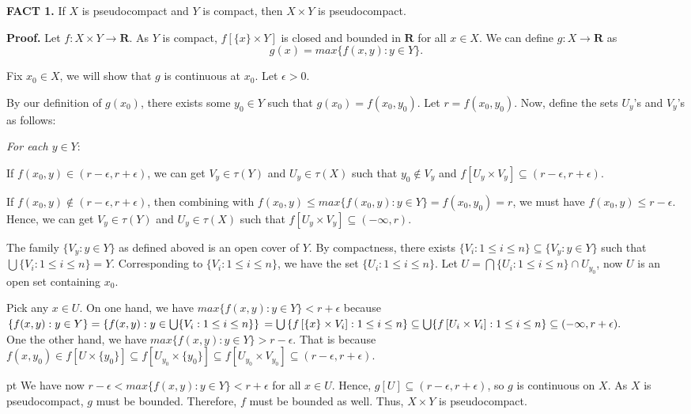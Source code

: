 \documentclass{article}
\begin{document}
\textbf{FACT 1.} If $X$ is pseudocompact and $Y$ is compact, then $X\times Y$ is pseudocompact. 

\vskip 15pt


\textbf{Proof.} Let $f: X\times Y \rightarrow \textbf{R}$. As $Y$ is compact, $f\left[ \{x\} \times Y\right] $ is 
closed and bounded in $\textbf{R}$ for all $x \in X$. We can define $g:X \rightarrow \textbf{R}$ as 
$$g(x)=max \{f(x,y):y\in Y\}.$$

Fix $x_0 \in X$, we will show that $g$ is continuous at $x_0$. Let $\epsilon >0$. 

\vskip 10pt


By our definition of $g(x_0)$, there exists some $y_0\in Y$ such that $g(x_0)=f(x_0,y_0)$. Let $r=f(x_0,y_0)$. Now, define the sets $U_y$'s and $V_y$'s as follows:  \vskip 12pt

\textsl{For each $y\in Y:$ }

If $f(x_0,y) \in (r-\epsilon, r+\epsilon)$, we can get $V_{y} \in \tau(Y) $ and $U_{y} \in \tau(X)$ such that $y_0\notin V_{y}$ and $f\left[U_y \times V_y\right] \subseteq (r-\epsilon, r+\epsilon)$. 

If $f(x_0,y) \notin (r-\epsilon, r+\epsilon)$, then combining with $f(x_0,y)\leq max\{f(x_0,y):y\in Y\}=f(x_0,y_0)=r$, we must have $f(x_0,y)\leq r-\epsilon$. Hence, we can get $V_{y} \in \tau(Y) $ and $U_{y} \in \tau(X)$ such that $f\left[U_y \times V_y\right] \subseteq (-\infty, r).$ \\

\vskip 12pt

The family $\{V_y: y\in Y\}$ as defined aboved is an open cover of $Y$. By compactness, there exists $\{V_i: 1\leq i \leq n\} \subseteq \{V_y: y\in Y\}$ such that $\bigcup \{V_i: 1\leq i \leq n\} = Y$. Corresponding to $\{V_i: 1\leq i \leq n\}$, we have the set $\{U_i: 1\leq i \leq n\}$. Let $U=\bigcap \{U_i: 1\leq i \leq n\} \cap U_{y_0}$, now $U$ is an open set containing $x_0$. \\

\vskip 5pt

Pick any $x\in U$. 
\vskip 10pt
On one hand, we have $max\{f(x,y):y\in Y\}<r+\epsilon$ because \\
$\{f(x,y):y\in Y\} = \left\{f(x,y):y\in \bigcup \{V_i: 1\leq i \leq n\}\right\}\\
=\bigcup \left\{f\left[\{x\}\times V_i\right]: 1\leq i\leq n\right\}\subseteq \bigcup \{f\left[U_i\times V_i\right]: 1\leq i\leq n\} \subseteq (-\infty, r+\epsilon).$\\

One the other hand, we have $max\{f(x,y):y\in Y\}>r-\epsilon$. That is because $f(x,y_0)\in f\left[U\times \{y_0\}\right] \subseteq f\left[U_{y_0} \times \{y_0\}\right] \subseteq f\left[U_{y_0} \times V_{y_0}\right] \subseteq (r-\epsilon, r+\epsilon)$.


 pt
We have now $r-\epsilon<max\{f(x,y):y\in Y\}<r+\epsilon$ for all $x\in U$. Hence, $g[U] \subseteq (r-\epsilon, r+\epsilon)$, so $g$ is continuous on $X$. 
As $X$ is pseudocompact, $g$ must be bounded. Therefore, $f$ must be bounded as well. 
Thus, $X\times Y$ is pseudocompact. 
\end{document}
